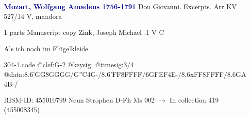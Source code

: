 \documentclass[twocolumn]{book}
\begin{document}
\newline \par \vspace{7pt} \textcolor{darkblue}{\textbf{Mozart, Wolfgang Amadeus  1756-1791}}
\newline Don Giovanni. Excerpts. Arr    KV 527/14
\newline V, mandora
\newline \begin{itshape}\end{itshape} 
\newline \textcolor{darkblue}{}  1 parts  
\newline Manuscript copy
\newline Zink, Joseph Michael
.1  V  C
\newline \begin{footnotesize} Als ich noch im Flügelkleide \end{footnotesize}  
\begin{filecontents*}{304-1.code}
@clef:G-2
@keysig:
@timesig:3/4
@data:8.6'GG8GGGG/{G''C}4G-/8.6'FF8FFFF/{6GFEF}4E-/8.6xFF8FFFF/{8.6GA}4B-/
\end{filecontents*}
\newline
%

\newline RISM-ID: 455010799
\newline Neun Strophen
\newline D-Fh  Ms 002
\newline $\rightarrow$ In collection 419 (455008345)
\end{document}
